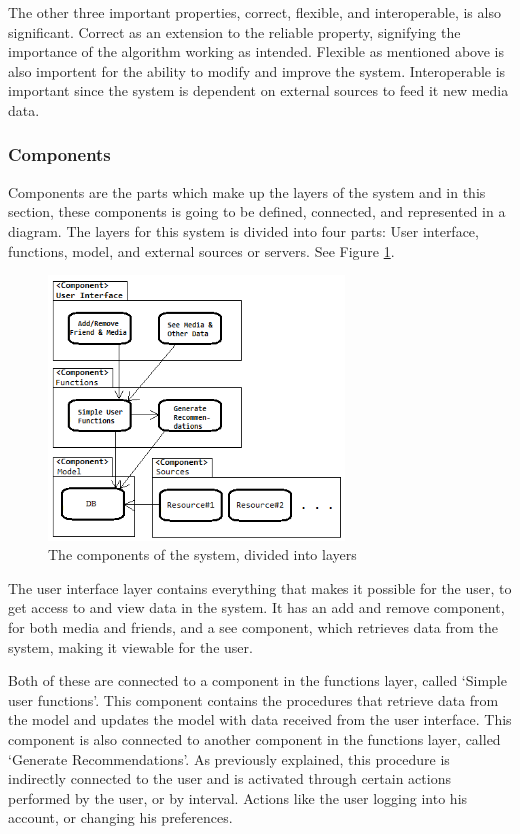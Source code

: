 The other three important properties, correct, flexible, and interoperable, is also significant. Correct as an extension to the reliable property, signifying the importance of the algorithm working as intended. Flexible as mentioned above is also importent for the ability to modify and improve the system. Interoperable is important since the system is dependent on external sources to feed it new media data.

\subsubsection{Components}

Components are the parts which make up the layers of the system and in this section, these components is going to be defined, connected, and represented in a diagram. The layers for this system is divided into four parts: User interface, functions, model, and external sources or servers. See Figure \ref{Components}.

\begin{figure}[htb]
\centering
\includegraphics[width=0.7\textwidth]{Images/Components.png}
\caption{The components of the system, divided into layers}
\label{Components}
\end{figure}

The user interface layer contains everything that makes it possible for the user, to get access to and view data in the system. It has an add and remove component, for both media and friends, and a see component, which retrieves data from the system, making it viewable for the user.

Both of these are connected to a component in the functions layer, called ‘Simple user functions’. This component contains the procedures that retrieve data from the model and updates the model with data received from the user interface. This component is also connected to another component in the functions layer, called ‘Generate Recommendations’. As previously explained, this procedure is indirectly connected to the user and is activated through certain actions performed by the user, or by interval. Actions like the user logging into his account, or changing his preferences.

